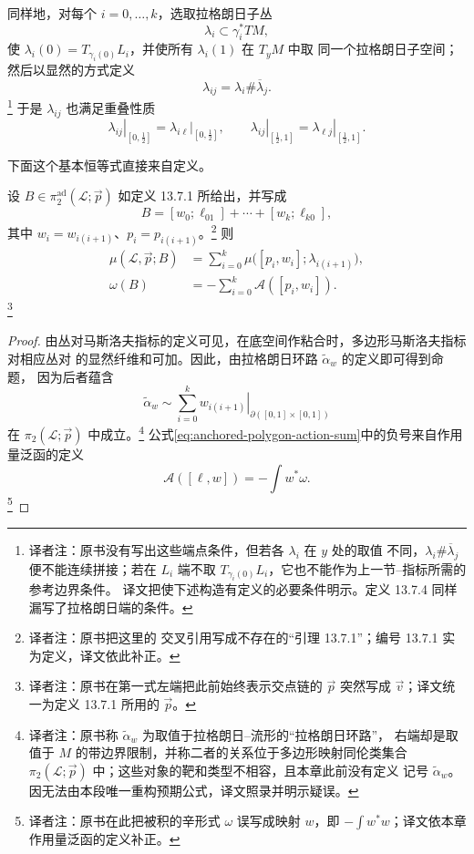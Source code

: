 同样地，对每个 $i=0,\ldots,k$，选取拉格朗日子丛
\[
  \lambda_i\subset\gamma_i^*TM,
\]
使 $\lambda_i(0)=T_{\gamma_i(0)}L_i$，并使所有 $\lambda_i(1)$ 在 $T_yM$ 中取
同一个拉格朗日子空间；然后以显然的方式定义
\[
  \lambda_{ij}=\lambda_i\#\overline\lambda_j.
\]
\footnote{译者注：原书没有写出这些端点条件，但若各 $\lambda_i$ 在 $y$ 处的取值
不同，$\lambda_i\#\overline\lambda_j$ 便不能连续拼接；若在 $L_i$ 端不取
$T_{\gamma_i(0)}L_i$，它也不能作为上一节\personMaslov{}--\personMorse{}指标所需的参考边界条件。
译文把使下述构造有定义的必要条件明示。定义 13.7.4 同样漏写了拉格朗日端的条件。}
于是 $\lambda_{ij}$ 也满足重叠性质
\[
  \left.\lambda_{ij}\right|_{[0,\frac12]}
  =\left.\lambda_{i\ell}\right|_{[0,\frac12]},
  \qquad
  \left.\lambda_{ij}\right|_{[\frac12,1]}
  =\left.\lambda_{\ell j}\right|_{[\frac12,1]}.
\]

下面这个基本恒等式直接来自定义。

\begin{proposition}
\label{prop:anchored-polygon-index-action-sums}
设 $B\in\pi_2^{\mathrm{ad}}(\mathcal L;\vec p)$ 如定义 13.7.1 所给出，并写成
\[
  B=[w_0;\ell_{01}]+\cdots+[w_k;\ell_{k0}],
\]
其中 $w_i=w_{i(i+1)}$、$p_i=p_{i(i+1)}$。\footnote{译者注：原书把这里的
交叉引用写成不存在的“引理 13.7.1”；编号 13.7.1 实为定义，译文依此补正。}
则
\begin{align}
  \mu(\mathcal L,\vec p;B)
    &=\sum_{i=0}^k
      \mu\bigl([p_i,w_i];\lambda_{i(i+1)}\bigr),
  \label{eq:anchored-polygon-maslov-sum}\\
  \omega(B)
    &=-\sum_{i=0}^k\mathcal A([p_i,w_i]).
  \label{eq:anchored-polygon-action-sum}
\end{align}
\footnote{译者注：原书在第一式左端把此前始终表示交点链的 $\vec p$ 突然写成
$\vec v$；译文统一为定义 13.7.1 所用的 $\vec p$。}
\end{proposition}

\begin{proof}
由丛对马斯洛夫指标的定义可见，在底空间作粘合时，多边形马斯洛夫指标对相应丛对
的显然纤维和可加。因此，由拉格朗日环路 $\widetilde\alpha_w$ 的定义即可得到命题，
因为后者蕴含
\[
  \widetilde\alpha_w
  \sim\sum_{i=0}^k
    \left.w_{i(i+1)}\right|_{\partial([0,1]\times[0,1])}
\]
在 $\pi_2(\mathcal L;\vec p)$ 中成立。\footnote{译者注：原书称
$\widetilde\alpha_w$ 为取值于拉格朗日--\personGrassmann{}流形的“拉格朗日环路”，
右端却是取值于 $M$ 的带边界限制，并称二者的关系位于多边形映射同伦类集合
$\pi_2(\mathcal L;\vec p)$ 中；这些对象的靶和类型不相容，且本章此前没有定义
记号 $\widetilde\alpha_w$。因无法由本段唯一重构预期公式，译文照录并明示疑误。}
公式\eqref{eq:anchored-polygon-action-sum}中的负号来自作用量泛函的定义
\[
  \mathcal A([\ell,w])=-\int w^*\omega.
\]
\footnote{译者注：原书在此把被积的辛形式 $\omega$ 误写成映射 $w$，即
$-\int w^*w$；译文依本章作用量泛函的定义补正。}
\end{proof}

